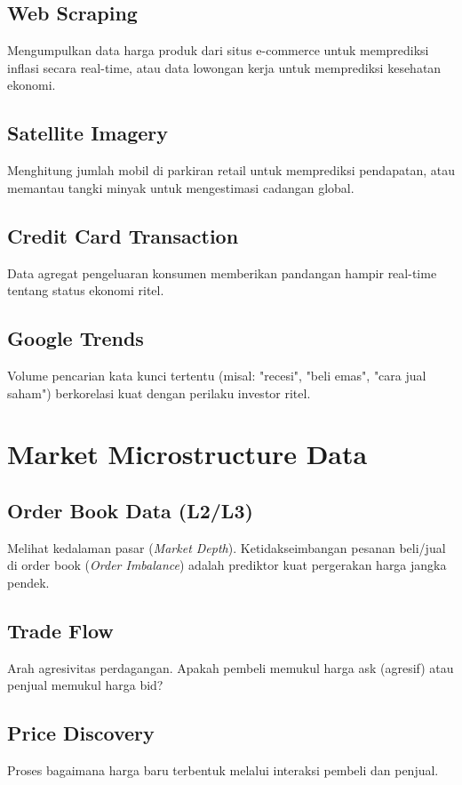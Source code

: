 \documentclass[12pt,a4paper]{book}
\begin{document}
\subsection{Web Scraping}
Mengumpulkan data harga produk dari situs e-commerce untuk memprediksi inflasi secara real-time, atau data lowongan kerja untuk memprediksi kesehatan ekonomi.

\subsection{Satellite Imagery}
Menghitung jumlah mobil di parkiran retail untuk memprediksi pendapatan, atau memantau tangki minyak untuk mengestimasi cadangan global.

\subsection{Credit Card Transaction}
Data agregat pengeluaran konsumen memberikan pandangan hampir real-time tentang status ekonomi ritel.

\subsection{Google Trends}
Volume pencarian kata kunci tertentu (misal: "recesi", "beli emas", "cara jual saham") berkorelasi kuat dengan perilaku investor ritel.

\section{Market Microstructure Data}
\subsection{Order Book Data (L2/L3)}
Melihat kedalaman pasar (\textit{Market Depth}). Ketidakseimbangan pesanan beli/jual di order book (\textit{Order Imbalance}) adalah prediktor kuat pergerakan harga jangka pendek.

\subsection{Trade Flow}
Arah agresivitas perdagangan. Apakah pembeli memukul harga ask (agresif) atau penjual memukul harga bid?

\subsection{Price Discovery}
Proses bagaimana harga baru terbentuk melalui interaksi pembeli dan penjual.
\end{document}
